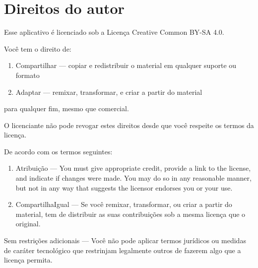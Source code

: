 \section*{Direitos do autor}

Esse aplicativo é licenciado sob a Licença Creative Common BY-SA 4.0.

Você tem o direito de:
\begin{enumerate}
\item  Compartilhar — copiar e redistribuir o material em qualquer suporte ou
  formato
\item Adaptar — remixar, transformar, e criar a partir do material 
\end{enumerate}
para qualquer fim, mesmo que comercial.

O licenciante não pode revogar estes direitos desde que você respeite os termos
da licença.

De acordo com os termos seguintes:
\begin{enumerate}
\item Atribuição — You must give appropriate credit, provide a link to the license, and indicate if changes were made. You may do so in any reasonable manner, but not in any way that suggests the licensor endorses you or your use. 
\item CompartilhaIgual — Se você remixar, transformar, ou criar a partir do material, tem de distribuir as suas contribuições sob a mesma licença que o original. 
\end{enumerate}
Sem restrições adicionais — Você não pode aplicar termos jurídicos ou medidas
de caráter tecnológico que restrinjam legalmente outros de fazerem algo que a
licença permita.
